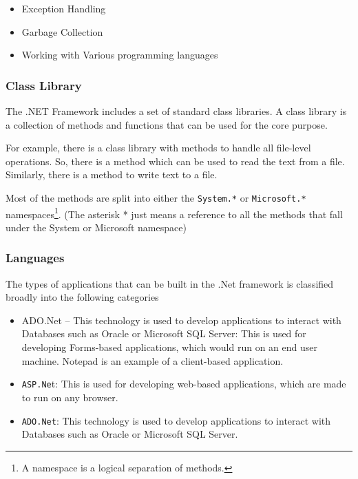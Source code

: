 \begin{itemize}
	\item Exception Handling
	\item Garbage Collection
	\item Working with Various programming languages 
\end{itemize}

\subsubsection{Class Library}
The .NET Framework includes a set of standard class libraries. A class library is a collection of methods and functions that can be used for the core purpose.

For example, there is a class library with methods to handle all file-level operations. So, there is a method which can be used to read the text from a file. Similarly, there is a method to write text to a file.

Most of the methods are split into either the \texttt{System.*} or \texttt{Microsoft.* } namespaces\footnote{A namespace is a logical separation of methods.}. (The asterisk * just means a reference to all the methods that fall under the System or Microsoft namespace)



\subsubsection{Languages}
The types of applications that can be built in the .Net framework is classified broadly into the following categories

\begin{itemize}
	\item ADO.Net – This technology is used to develop applications to interact with Databases such as Oracle or Microsoft SQL Server: This is used for developing Forms-based applications, which would run on an end user machine. Notepad is an example of a client-based application.
	\item \texttt{ASP.Ne}t: This is used for developing web-based applications, which are made to run on any browser.
	\item \texttt{ADO.Net}: This technology is used to develop applications to interact with Databases such as Oracle or Microsoft SQL Server.
\end{itemize}



